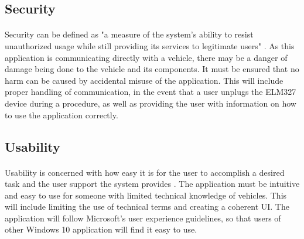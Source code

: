 	\subsection{Security}
		\paragraph{}{
		Security can be defined as "a measure of the system's ability to resist unauthorized usage while still providing its services to legitimate users" \cite{SAinP}. As this application is communicating directly with a vehicle, there may be a danger of damage being done to the vehicle and its components. It must be ensured that no harm can be caused by accidental misuse of the application. This will include proper handling of communication, in the event that a user unplugs the ELM327 device during a procedure, as well as providing the user with information on how to use the application correctly.
		}		
	\subsection{Usability}
		\paragraph{}{
		Usability is concerned with how easy it is for the user to accomplish a desired task and the user support the system provides \cite{SAinP}. The application must be intuitive and easy to use for someone with limited technical knowledge of vehicles. This will include limiting the use of technical terms and creating a coherent UI. The application will follow Microsoft's user experience guidelines, so that users of other Windows 10 application will find it easy to use.
		}
